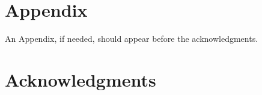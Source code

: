 \documentclass[conf]{new-aiaa}
\begin{document}
\clearpage
\FloatBarrier
\section*{Appendix}

An Appendix, if needed, should appear before the acknowledgments.





\section*{Acknowledgments}


%
\end{document}
